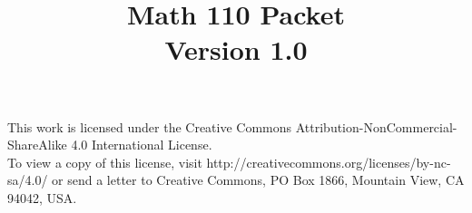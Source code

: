 \documentclass[11pt,letterpaper,english]{book}
\begin{document}
\dominitoc
\title{Math 110 Packet\\
Version 1.0}
\date{}

\maketitle
\newpage
\thispagestyle{empty}
\vspace*{\fill}
This work is licensed under the Creative Commons Attribution-NonCommercial-ShareAlike 4.0 International License. \\To view a copy of this license, visit http://creativecommons.org/licenses/by-nc-sa/4.0/ or send a letter to Creative Commons, PO Box 1866, Mountain View, CA 94042, USA.
\vspace*{\fill}
\frontmatter
\pagestyle{plain}
\tableofcontents{}
\mainmatter
\pagestyle{fancy}












\end{document}
